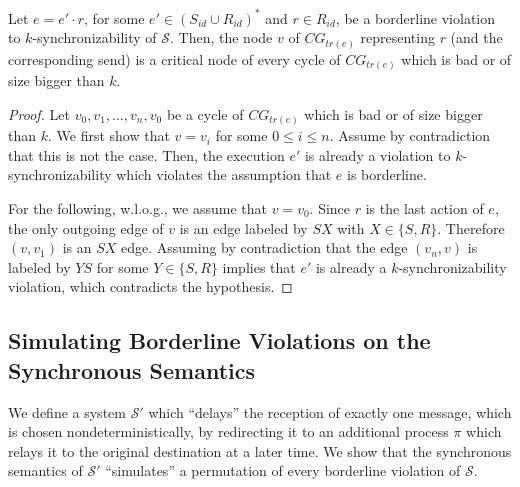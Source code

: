 \begin{lemma}\label{lem:critical}
Let $e = e'\cdot r$, for some $e'\in (S_{id}\cup R_{id})^*$ and $r\in R_{id}$, be a borderline violation to $k$-synchronizability of $\mathcal{S}$. 
Then, the node $v$ of $CG_{tr(e)}$ representing $r$ (and the corresponding send) is a critical node of every cycle of 
$CG_{tr(e)}$ which is bad or of size bigger than $k$. %
\end{lemma}
\begin{proof}
Let $v_0,v_1,\ldots,v_n,v_0$ be a cycle of $CG_{tr(e)}$ which is bad or of size bigger than $k$. We first show that $v=v_i$ for some $0\leq i\leq n$. 
Assume by contradiction that this is not the case. Then, the execution $e'$ is already a violation to $k$-synchronizability which violates the assumption that $e$ is borderline.

For the following, w.l.o.g., we assume that $v=v_0$. Since $r$ is the last action of $e$, the only outgoing edge of $v$ is an edge labeled by $SX$ with $X\in \{S,R\}$. Therefore $(v,v_1)$ is an $SX$ edge. 
Assuming by contradiction that the edge $(v_n,v)$ is labeled by $YS$ for some $Y\in \{S,R\}$ implies that $e'$ is already a $k$-synchronizability violation, which contradicts the hypothesis.
\end{proof}

\subsection{Simulating Borderline Violations on the Synchronous Semantics}

We define a system $\mathcal{S'}$ which ``delays'' the reception of exactly one message, which is chosen nondeterministically,
by redirecting it to an additional process $\pi$ which relays it to the original destination at a later time. We show that
the synchronous semantics of $\mathcal{S'}$ ``simulates'' a permutation of every borderline violation of 
$\mathcal{S}$. 

